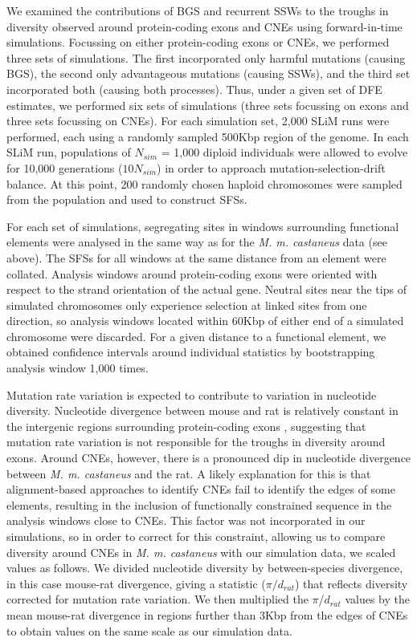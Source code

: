 We examined the contributions of BGS and recurrent SSWs to the troughs in diversity observed around protein-coding exons and CNEs using forward-in-time simulations. Focussing on either protein-coding exons or CNEs, we performed three sets of simulations. The first incorporated only harmful mutations (causing BGS), the second only advantageous mutations (causing SSWs), and the third set incorporated both (causing both processes). Thus, under a given set of DFE estimates, we performed six sets of simulations (three sets focussing on exons and three sets focussing on CNEs). For each simulation set, 2,000 SLiM runs were performed, each using a randomly sampled 500Kbp region of the genome. In each SLiM run, populations of $N_{sim}$ = 1,000 diploid individuals were allowed to evolve for 10,000 generations ($10N_{sim}$) in order to approach mutation-selection-drift balance. At this point, 200 randomly chosen haploid chromosomes were sampled from the population and used to construct SFSs.
 
For each set of simulations, segregating sites in windows surrounding functional elements were analysed in the same way as for the \textit{M. m. castaneus} data (see above). The SFSs for all windows at the same distance from an element were collated. Analysis windows around protein-coding exons were oriented with respect to the strand orientation of the actual gene. Neutral sites near the tips of simulated chromosomes only experience selection at linked sites from one direction, so analysis windows located within 60Kbp of either end of a simulated chromosome were discarded. For a given distance to a functional element, we obtained confidence intervals around individual statistics by bootstrapping analysis window 1,000 times.

Mutation rate variation is expected to contribute to variation in nucleotide diversity. Nucleotide divergence between mouse and rat is relatively constant in the intergenic regions surrounding protein-coding exons \citep{RN122}, suggesting that mutation rate variation is not responsible for the troughs in diversity around exons. Around CNEs, however, there is a pronounced dip in nucleotide divergence between \textit{M. m. castaneus} and the rat. A likely explanation for this is that alignment-based approaches to identify CNEs fail to identify the edges of some elements, resulting in the inclusion of functionally constrained sequence in the analysis windows close to CNEs. This factor was not incorporated in our simulations, so in order to correct for this constraint, allowing us to compare diversity around CNEs in \textit{M. m. castaneus} with our simulation data, we scaled values as follows. We divided nucleotide diversity by between-species divergence, in this case mouse-rat divergence, giving a statistic ($\pi/d_{rat}$) that reflects diversity corrected for mutation rate variation. We then multiplied the $\pi$/$d_{rat}$ values by the mean mouse-rat divergence in regions further than 3Kbp from the edges of CNEs to obtain values on the same scale as our simulation data.

